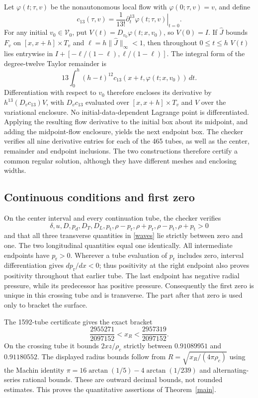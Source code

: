 \documentclass[11pt]{article}
\newcommand{\dd}{\delta}
\newcommand{\pr}{p_{\mathrm r}}
\newcommand{\pt}{p_{\mathrm t}}
\begin{document}
Let $\varphi(t;\tau,v)$ be the nonautonomous local flow with
$\varphi(0;\tau,v)=v$, and define
\[
 c_{13}(\tau,v)=\frac1{13!}
       \left.\partial_t^{13}\varphi(t;\tau,v)\right|_{t=0}.
\]
For any initial $v_0\in\mathcal V_0$, put
$V(t)=D_{v_0}\varphi(t;x,v_0)$, so $V(0)=I$.
If $\widehat J$ bounds $F_v$ on $[x,x+h]\times T_v$ and
$\ell=h\|\widehat J\|_\infty<1$, then throughout $0\leq t\leq h$
$V(t)$ lies entrywise in
$I+[-\ell/(1-\ell),\ell/(1-\ell)]$.
The integral form of the degree-twelve Taylor remainder is
\[
 13\int_0^h(h-t)^{12}
 c_{13}(x+t,\varphi(t;x,v_0))\,dt.
\]
Differentiation with respect to $v_0$ therefore encloses its
derivative by $h^{13}(D_vc_{13})V$, with $D_vc_{13}$ evaluated
over $[x,x+h]\times T_v$ and $V$ over the variational enclosure.
No initial-data-dependent Lagrange point is differentiated.
Applying the resulting flow derivative to the initial box about its
midpoint, and adding the midpoint-flow enclosure, yields the next
endpoint box. The checker verifies all nine derivative entries for
each of the 465 tubes, as well as the center, remainder and endpoint
inclusions. The two constructions therefore certify a common regular
solution, although they have different meshes and enclosing widths.

\subsection{Continuous conditions and first zero}
On the center interval and every continuation tube, the checker verifies
\[
 \dd,u,D,p_d,D_T,D_L,\pt,\rho-\pr,\rho+\pr,\rho-\pt,\rho+\pt>0
\]
and that all three transverse quantities in \eqref{waves} lie strictly between zero and one. The two longitudinal quantities equal one identically.
All intermediate endpoints have $\pr>0$. Wherever a tube evaluation of $\pr$ includes zero, interval differentiation gives $d\pr/dx<0$; thus positivity at the right endpoint also proves positivity throughout that earlier tube. The last endpoint has negative radial pressure, while its predecessor has positive pressure. Consequently the first zero is unique in this crossing tube and is transverse. The part after that zero is used only to bracket the surface.

The 1592-tube certificate gives the exact bracket
\[
 \frac{2955271}{2097152}<x_R<\frac{2957319}{2097152}.
\]
On the crossing tube it bounds $2xz/\rho_c$ strictly between $0.91089951$ and $0.91180552$. The displayed radius bounds follow from $R=\sqrt{x_R/(4\pi\rho_c)}$ using the Machin identity $\pi=16\arctan(1/5)-4\arctan(1/239)$ and alternating-series rational bounds. These are outward decimal bounds, not rounded estimates. This proves the quantitative assertions of Theorem~\ref{main}.
\end{document}
